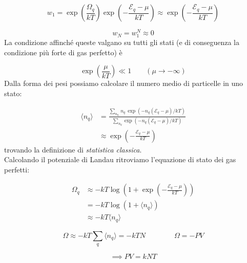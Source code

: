\documentclass[a4paper]{report}
\newcommand\ddfrac[2]{\frac{\displaystyle #1}{\displaystyle #2}}
\begin{document}
\begin{equation}
    w_{1} = \exp \left(\frac{\Omega_q}{k T}\right) \exp \left(-\frac{\mathcal{E}_q - \mu}{k T}\right) \approx \exp \left(-\frac{\mathcal{E}_q - \mu}{k T}\right)
\end{equation}

\begin{equation}
    w_{N} = w_{1}^{N} \approx 0
\end{equation}
La condizione affinché queste valgano su tutti gli stati (e di conseguenza la condizione più forte di gas perfetto) è

\begin{equation}
    \exp\left(\frac{\mu}{k T}\right) \ll 1 \qquad (\mu \rightarrow -\infty)
\end{equation}
Dalla forma dei pesi possiamo calcolare il numero medio di particelle in uno stato:

\begin{equation}
\begin{split}
    \langle n_q \rangle  & = \ddfrac{\sum_{n_{q}} \,n_q\, \exp(-n_q(\mathcal{E}_q-\mu)/k T)}{\sum_{n_{q}}  \exp(-n_q(\mathcal{E}_q-\mu)/k T)}\\
    & \approx \exp\left(-\frac{\mathcal{E}_q-\mu}{k T}\right)
\end{split}
\label{statclassica}
\end{equation}
trovando la definizione di \textit{statistica classica}.\\
Calcolando il potenziale di Landau ritroviamo l'equazione di stato dei gas perfetti:

\begin{equation}
    \begin{split}
        \Omega_q & \approx -k T \log \left(1+\exp\left(-\frac{\mathcal{E}_q-\mu}{k T}\right)\right) \\
        & = -k T \log \left(1+\langle n_q \rangle\right)\\
        & \approx -k T \langle n_q \rangle
    \end{split}
\end{equation}

\begin{equation}
    \Omega \approx -k T \sum_q \langle n_q \rangle = - kTN \qquad \qquad \Omega = -PV
\end{equation}

\begin{equation}
    \implies PV = kNT
    \label{gasperfetti}
\end{equation}
\end{document}
